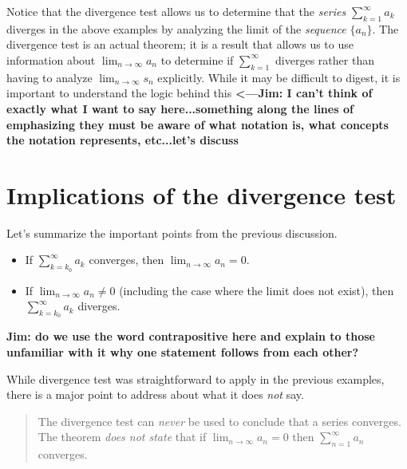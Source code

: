 \documentclass{ximera}
\begin{document}
\begin{warning}
Notice that the divergence test allows us to determine that the \emph{series} $\sum_{k=1}^{\infty} a_k$ diverges in the above examples by analyzing the limit of the \emph{sequence} $\{a_n\}$.  The divergence test is an actual theorem; it is a result that allows us to use information about $\lim_{n \to \infty} a_n$ to determine if $\sum_{k=1}^{\infty}$ diverges rather than having to analyze $\lim_{n \to \infty} s_n$ explicitly.  While it may be difficult to digest, it is important to understand the logic behind this  \textbf{<---Jim: I can't think of exactly what I want to say here...something along the lines of emphasizing they must be aware of what notation is, what concepts the notation represents, etc...let's discuss}
\end{warning}

\section{Implications of the divergence test}

Let's summarize the important points from the previous discussion.

\begin{itemize}
\item If $\sum_{k=k_0}^\infty a_k$ converges, then $\lim_{n \to \infty} a_n =0$.
\item If $\lim_{n \to \infty} a_n \neq 0$ (including the case where the limit does not exist), then $\sum_{k=k_0}^{\infty} a_k$ diverges.
\end{itemize}

\textbf{Jim: do we use the word contrapositive here and explain to those unfamiliar with it why one statement follows from each other?} 

While divergence test was straightforward to apply in the previous examples, there is a major point to address about what it does \emph{not} say.

\begin{quote}
  The divergence test can \emph{never} be used to conclude that a series converges. The theorem \emph{does not state} that if $\lim_{n\to\infty} a_n =
  0$ then $\sum_{n=1}^\infty a_n$ converges.

\end{quote}
  
\end{document}
